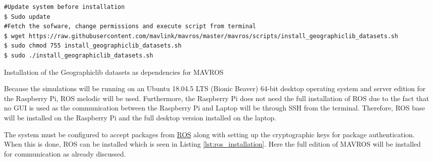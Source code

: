 \documentclass[../Head/report.tex]{subfiles}
\begin{document}
\begin{listing}[H] 
\begin{tcolorbox}[
    enhanced,
    attach boxed title to top left={xshift=6mm,yshift=-3mm},
    colback=lightgreen!20,
    colframe=lightgreen,
    fonttitle=\bfseries\color{black},
]
\begin{verbatim}
#Update system before installation 
$ Sudo update
#Fetch the sofware, change permissions and execute script from terminal
$ wget https://raw.githubusercontent.com/mavlink/mavros/master/mavros/scripts/install_geographiclib_datasets.sh
$ sudo chmod 755 install_geographiclib_datasets.sh
$ sudo ./install_geographiclib_datasets.sh
\end{verbatim}
\end{tcolorbox}
\caption{Installation of the Geographiclib datasets as dependencies for MAVROS}
\label{lst:install_geographiclib_datasets}    
\end{listing}

Because the simulations will be running on an Ubuntu 18.04.5 LTS (Bionic Beaver) 64-bit desktop operating system and server edition for the Raspberry Pi, ROS melodic will be used. Furthermore, the Raspberry Pi does not need the full installation of ROS due to the fact that no GUI is used as the communication between the Raspberry Pi and Laptop will be through SSH from the terminal. Therefore, ROS base will be installed on the Raspberry Pi and the full desktop version installed on the laptop. 

The system must be configured to accept packages from \href{http://wiki.ros.org/melodic/Installation/Ubuntu}{ROS} along with setting up the cryptographic keys for package authentication. When this is done, ROS can be installed which is seen in Listing \ref{lst:ros_installation}. Here the full edition of MAVROS will be installed for communication as already discussed. 
\end{document}

